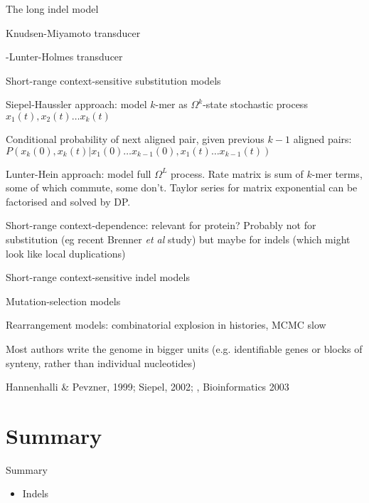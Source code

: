 \documentclass{beamer}
\begin{document}
\begin{frame}{}

\itemb
\item The long indel model
 \itemb
 \item Knudsen-Miyamoto transducer
 \item \Miklos-Lunter-Holmes transducer
 \iteme
\item Short-range context-sensitive substitution models
 \itemb
 \item Siepel-Haussler approach: model $k$-mer as $\Omega^k$-state stochastic process $x_1(t), x_2(t) \ldots x_k(t)$
  \itemb
  \item Conditional probability of next aligned pair, given previous $k-1$ aligned pairs:
$P(x_k(0),x_k(t)|x_1(0) \ldots x_{k-1}(0),x_1(t) \ldots x_{k-1}(t))$
  \iteme
 \item Lunter-Hein approach: model full $\Omega^L$ process.
Rate matrix is sum of $k$-mer terms, some of which commute, some don't.
Taylor series for matrix exponential can be factorised and solved by DP.
 \item Short-range context-dependence: relevant for protein?
Probably not for substitution (eg recent Brenner {\em et al} study)
but maybe for indels (which might look like local duplications)
 \iteme
\item Short-range context-sensitive indel models
\item Mutation-selection models
\item Rearrangement models: combinatorial explosion in histories, MCMC slow
 \itemb
 \item Most authors write the genome in bigger units (e.g. identifiable genes or blocks of synteny, rather than individual nucleotides)
 \item Hannenhalli \& Pevzner, 1999; Siepel, 2002; \Miklos, Bioinformatics 2003
 \iteme
\iteme

\end{frame}




\section*{Summary}

\begin{frame}{Summary}

  \begin{itemize}
  \item Indels
  \end{itemize}

\end{frame}
\end{document}
